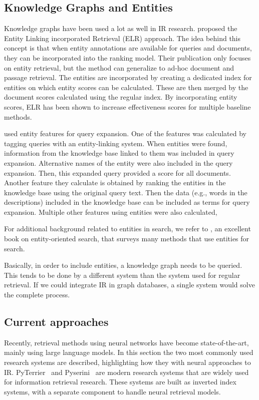\subsection{Knowledge Graphs and Entities}
Knowledge graphs have been used a lot as well in IR research.  proposed the Entity Linking incorporated Retrieval (ELR) approach. The idea behind this concept is that when entity annotations are available for queries and documents, they can be incorporated into the ranking model. Their publication only focuses on entity retrieval, but the method can generalize to ad-hoc document and passage retrieval. The entities are incorporated by creating a dedicated index for entities on which entity scores can be calculated. These are then merged by the document scores calculated using the regular index. By incorporating entity scores, ELR has been shown to increase effectiveness scores for multiple baseline methods. 

 used entity features for query expansion. One of the features was calculated by tagging queries with an entity-linking system. When entities were found, information from the knowledge base linked to them was included in query expansion. Alternative names of the entity were also included in the query expansion. Then, this expanded query provided a score for all documents. Another feature they calculate is obtained by ranking the entities in the knowledge base using the original query text. Then the data (e.g., words in the descriptions) included in the knowledge base can be included as terms for query expansion. Multiple other features using entities were also calculated, 

For additional background related to entities in search, we refer to , an excellent book on entity-oriented search, that surveys many methods that use entities for search. 

Basically, in order to include entities, a knowledge graph needs to be queried. This tends to be done by a different system than the system used for regular retrieval. If we could integrate IR in graph databases, a single system would solve the complete process.

\subsection{Current approaches}
Recently, retrieval methods using neural networks have become state-of-the-art, mainly using large language models. In this section the two most commonly used research systems are described, highlighting how they with neural approaches to IR.
PyTerrier~\citep{pyterrier} and Pyserini~\citep{pyserini} are modern research systems that are widely used for information retrieval research. These systems are built as inverted index systems, with a separate component to handle neural retrieval models. 


